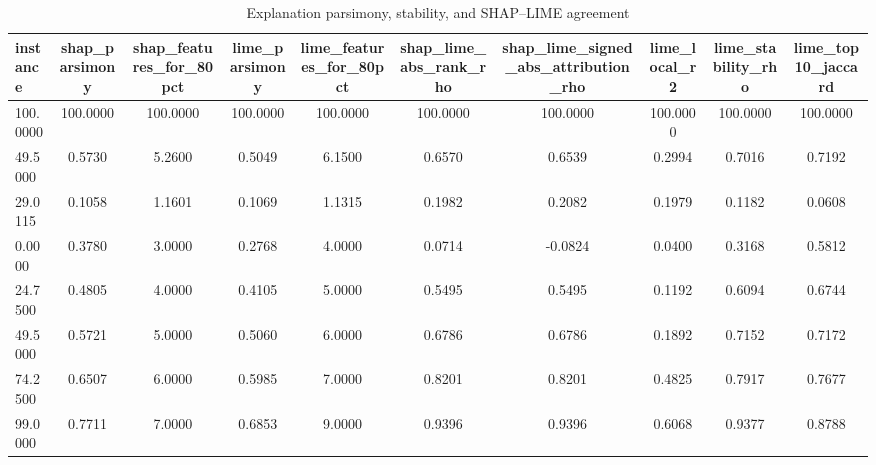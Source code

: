 \begin{table}
\centering
\caption{Explanation parsimony, stability, and SHAP--LIME agreement}
\label{tab:explanation_quality}
\begin{tabular}{lccccccccc}
\toprule
instance & shap_parsimony & shap_features_for_80pct & lime_parsimony & lime_features_for_80pct & shap_lime_abs_rank_rho & shap_lime_signed_abs_attribution_rho & lime_local_r2 & lime_stability_rho & lime_top10_jaccard \\
\midrule
100.0000 & 100.0000 & 100.0000 & 100.0000 & 100.0000 & 100.0000 & 100.0000 & 100.0000 & 100.0000 & 100.0000 \\
49.5000 & 0.5730 & 5.2600 & 0.5049 & 6.1500 & 0.6570 & 0.6539 & 0.2994 & 0.7016 & 0.7192 \\
29.0115 & 0.1058 & 1.1601 & 0.1069 & 1.1315 & 0.1982 & 0.2082 & 0.1979 & 0.1182 & 0.0608 \\
0.0000 & 0.3780 & 3.0000 & 0.2768 & 4.0000 & 0.0714 & -0.0824 & 0.0400 & 0.3168 & 0.5812 \\
24.7500 & 0.4805 & 4.0000 & 0.4105 & 5.0000 & 0.5495 & 0.5495 & 0.1192 & 0.6094 & 0.6744 \\
49.5000 & 0.5721 & 5.0000 & 0.5060 & 6.0000 & 0.6786 & 0.6786 & 0.1892 & 0.7152 & 0.7172 \\
74.2500 & 0.6507 & 6.0000 & 0.5985 & 7.0000 & 0.8201 & 0.8201 & 0.4825 & 0.7917 & 0.7677 \\
99.0000 & 0.7711 & 7.0000 & 0.6853 & 9.0000 & 0.9396 & 0.9396 & 0.6068 & 0.9377 & 0.8788 \\
\bottomrule
\end{tabular}
\end{table}
